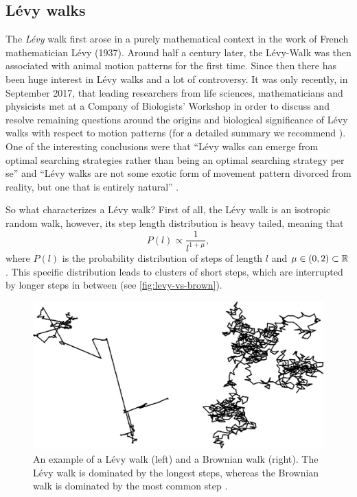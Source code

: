 \subsection{Lévy walks}\label{ssec:levy-walk}
The \textit{Lévy} walk first arose in a purely mathematical context in the work of French mathematician Lévy (1937). Around half a century later, the Lévy-Walk was then associated with animal motion patterns for the first time. Since then there has been huge interest in Lévy walks and a lot of controversy. It was only recently, in September 2017, that leading researchers from life sciences, mathematicians and physicists met at a Company of Biologists' Workshop in order to discuss and resolve remaining questions around the origins and biological significance of Lévy walks with respect to motion patterns (for a detailed summary we recommend \cite{reynolds:2018}). One of the interesting conclusions were that ``Lévy walks can emerge from optimal searching strategies rather than being an optimal searching strategy per se'' and ``Lévy walks are not some exotic form of movement pattern divorced from reality, but one that is entirely natural'' \cite{reynolds:2018}.

So what characterizes a Lévy walk? First of all, the Lévy walk is an isotropic random walk, however, its step length distribution is heavy tailed, meaning that
\begin{equation*}
 P(l) \propto \frac{1}{l^{1+\mu}},
\end{equation*}
where $P(l)$ is the probability distribution of steps of length $l$ and $\mu \in (0,2) \subset \operatorname{\mathbb{R}}$. This specific distribution leads to clusters of short steps, which are interrupted by longer steps in between (see \autoref{fig:levy-vs-brown}).

\begin{figure}[bth]
 \myfloatalign
 \includegraphics[width=0.8\linewidth]{gfx/levy-vs-brown}
 \caption[Lévy vs. Brownian walk]{An example of a Lévy walk (left) and a Brownian walk (right). The Lévy walk is dominated by the longest steps, whereas the Brownian walk is dominated by the most common step \cite{reynolds:2018}.}\label{fig:levy-vs-brown}
\end{figure}

